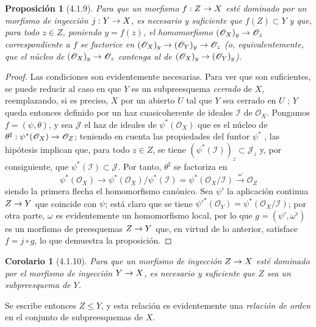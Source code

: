\documentclass[oneside]{amsart}
\theoremstyle{ega-env-style}
\theoremstyle{ega-thm-env-style}
\newtheorem*{proposition}{Proposición}
\newtheorem*{corollary}{Corolario}
\theoremstyle{ega-defn-env-style}
\def\leq{\leqslant}                 %
\renewcommand{\to}{\mathchoice{\longrightarrow}{\rightarrow}{\rightarrow}{\rightarrow}}
\newcommand{\oldpage}[2][]{{\marginnote{\normalfont{\textbf{#1}~|~#2}}}\ignorespaces}
\let\EGAOriginalLabel\label
\renewcommand{\label}[1]{\phantomsection\EGAOriginalLabel{#1}}
\begin{document}
\begin{proposition}[4.1.9]
\label{I.4.1.9}
Para que un morfismo $f:Z\to X$ esté dominado por un morfismo de inyección $j:Y\to X$, es necesario y suficiente que $f(Z)\subset Y$ y que, para todo $z\in Z$, poniendo $y=f(z)$, el homomorfismo $(\mathscr{O}_X)_y\to\mathscr{O}_z$ correspondiente a $f$ se factorice en $(\mathscr{O}_X)_y\to(\mathscr{O}_Y)_y\to\mathscr{O}_z$ (\textup{o, equivalentemente, que} el núcleo de $(\mathscr{O}_X)_y\to\mathscr{O}_z$ contenga al de $(\mathscr{O}_X)_y\to(\mathscr{O}_Y)_y$).
\end{proposition}

\begin{proof}
Las condiciones son evidentemente necesarias.
Para ver que son suficientes, se puede reducir al caso en que $Y$ es un subpreesquema \emph{cerrado} de $X$, reemplazando, si es preciso, $X$ por un abierto $U$ tal que $Y$ sea cerrado en $U$ ;
$Y$ queda entonces definido por un haz cuasicoherente de ideales $\mathscr{I}$ de $\mathscr{O}_X$.
Pongamos $f=(\psi,\theta)$, y sea $\mathscr{J}$ el haz de ideales de $\psi^*(\mathscr{O}_X)$ que es el núcleo de $\theta^\sharp:\psi^*(\mathscr{O}_X)\to\mathscr{O}_Z$;
teniendo en cuenta las propiedades del funtor $\psi^*$ , las hipótesis implican que, para todo $z\in Z$, se tiene $(\psi^*(\mathscr{I}))_z\subset\mathscr{J}_z$ y, por consiguiente, que $\psi^*(\mathscr{I})\subset\mathscr{J}$.
Por tanto, $\theta^\sharp$ se factoriza en
\[
  \psi^*(\mathscr{O}_X)\longrightarrow
  \psi^*(\mathscr{O}_X)/\psi^*(\mathscr{I})
  =\psi^*(\mathscr{O}_X/\mathscr{I})
  \xrightarrow{\omega}\mathscr{O}_Z
\]
siendo la primera flecha el homomorfismo canónico.
Sea $\psi'$ la aplicación continua $Z\to Y$ que coincide con $\psi$;
está claro que se tiene ${\psi'}^*(\mathscr{O}_Y)=\psi^*(\mathscr{O}_X/\mathscr{I})$;
por otra parte, $\omega$ es evidentemente un homomorfismo local, por lo que $g=(\psi',\omega^\flat)$ es un morfismo
\oldpage[I]{122}
de preesquemas $Z\to Y$  que, en virtud de lo anterior, satisface $f=j\circ g$, lo que demuestra la proposición.
\end{proof}

\begin{corollary}[4.1.10]
\label{I.4.1.10}
Para que un morfismo de inyección $Z\to X$ esté dominado por el morfismo de inyección $Y\to X$, es necesario y suficiente que $Z$ sea un subpreesquema de $Y$.
\end{corollary}

Se escribe entonces $Z\leq Y$, y esta relación es evidentemente una \emph{relación de orden} en el conjunto de subpreesquemas de $X$.
\end{document}
